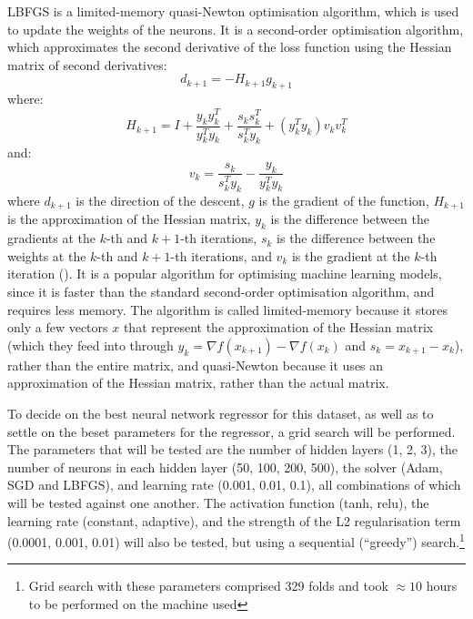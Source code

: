 \documentclass[12pt]{report}
\begin{document}
LBFGS is a limited-memory quasi-Newton optimisation algorithm, which is used to update the weights of the neurons. It is a second-order optimisation algorithm, which approximates the second derivative of the loss function using the Hessian matrix of second derivatives:
\begin{equation}
	d_{k+1} = -H_{k+1}g_{k+1}
\end{equation}
where:
\begin{equation}
    H_{k+1} = I + \frac{y_k y_k^T}{y_k^{T}y_{k}} + \frac{s_{k} s_{k}^{T}}{s_{k}^{T}y_{k}}+(y_{k}^{T}y_{k})v_k v_{k}^{T}
\end{equation}
and:
\begin{equation}
    v_k = \frac{s_{k}}{s_{k}^{T}y_{k}}-\frac{y_{k}}{y_{k}^{T}y_{k}}
\end{equation}
where $d_{k+1}$ is the direction of the descent, $g$ is the gradient of the function, $H_{k+1}$ is the approximation of the Hessian matrix, $y_k$ is the difference between the gradients at the $k$-th and $k+1$-th iterations, $s_k$ is the difference between the weights at the $k$-th and $k+1$-th iterations, and $v_k$ is the gradient at the $k$-th iteration (\cite[p. 181]{pytlak2009}).
It is a popular algorithm for optimising machine learning models, since it is faster than the standard second-order optimisation algorithm, and requires less memory. The algorithm is called limited-memory because it stores only a few vectors $x$ that represent the approximation of the Hessian matrix (which they feed into through $y_k = \nabla f(x_{k+1})-\nabla f(x_k)$ and $s_k = x_{k+1}-x_k$), rather than the entire matrix, and quasi-Newton because it uses an approximation of the Hessian matrix, rather than the actual matrix.

To decide on the best neural network regressor for this dataset, as well as to settle on the beset parameters for the regressor, a grid search will be performed. The parameters that will be tested are the number of hidden layers (1, 2, 3), the number of neurons in each hidden layer (50, 100, 200, 500), the solver (Adam, SGD and LBFGS), and learning rate (0.001, 0.01, 0.1), all combinations of which will be tested against one another. The activation function (tanh, relu), the learning rate (constant, adaptive), and the strength of the L2 regularisation term (0.0001, 0.001, 0.01) will also be tested, but using a sequential (``greedy'') search.\footnote{Grid search with these parameters comprised 329 folds and took $\approx10$ hours to be performed on the machine used}
\end{document}
